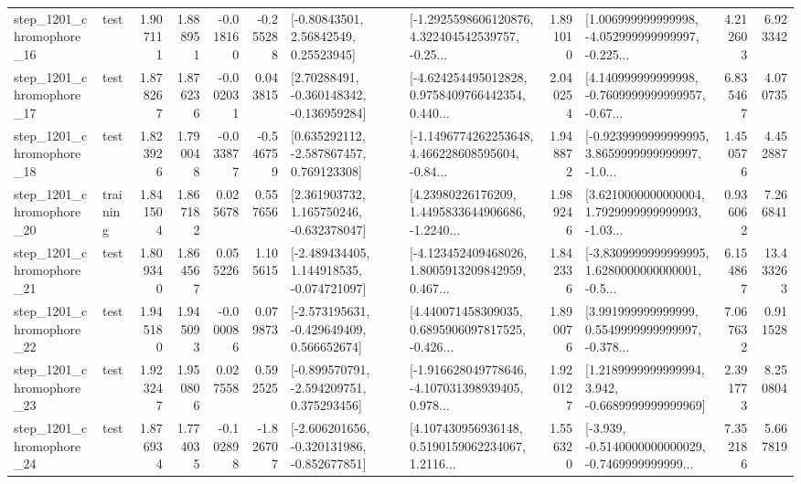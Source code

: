\begin{tabular}{llrrrrllrlrr}
 step\_1201\_chromophore\_16 &      test &      1.907111 &    1.888951 &     -0.018160 & -0.255288 &       [-0.80843501, 2.56842549, 0.25523945] &  [-1.2925598606120876, 4.322404542539757, -0.25... &       1.891010 &  [1.006999999999998, -4.052999999999997, -0.225... &            4.212603 &          6.923342 \\
 step\_1201\_chromophore\_17 &      test &      1.878267 &    1.876236 &     -0.002031 &  0.043815 &    [2.70288491, -0.360148342, -0.136959284] &  [-4.624254495012828, 0.9758409766442354, 0.440... &       2.040254 &  [4.140999999999998, -0.7609999999999957, -0.67... &            6.835467 &          4.070735 \\
 step\_1201\_chromophore\_18 &      test &      1.823926 &    1.790048 &     -0.033877 & -0.546759 &    [0.635292112, -2.587867457, 0.769123308] &  [-1.1496774262253648, 4.466228608595604, -0.84... &       1.948872 &  [-0.9239999999999995, 3.8659999999999997, -1.0... &            1.450576 &          4.452887 \\
 step\_1201\_chromophore\_20 &  training &      1.841504 &    1.867182 &      0.025678 &  0.557656 &    [2.361903732, 1.165750246, -0.632378047] &  [4.23980226176209, 1.4495833644906686, -1.2240... &       1.989246 &  [3.6210000000000004, 1.7929999999999993, -1.03... &            0.936062 &          7.266841 \\
 step\_1201\_chromophore\_21 &      test &      1.809340 &    1.864567 &      0.055226 &  1.105615 &   [-2.489434405, 1.144918535, -0.074721097] &  [-4.123452409468026, 1.8005913209842959, 0.467... &       1.842336 &  [-3.8309999999999995, 1.6280000000000001, -0.5... &            6.154867 &         13.433263 \\
 step\_1201\_chromophore\_22 &      test &      1.945180 &    1.945093 &     -0.000086 &  0.079873 &   [-2.573195631, -0.429649409, 0.566652674] &  [4.440071458309035, 0.6895906097817525, -0.426... &       1.890076 &  [3.991999999999999, 0.5549999999999997, -0.378... &            7.067632 &          0.911528 \\
 step\_1201\_chromophore\_23 &      test &      1.923247 &    1.950806 &      0.027558 &  0.592525 &   [-0.899570791, -2.594209751, 0.375293456] &  [-1.916628049778646, -4.107031398939405, 0.978... &       1.920127 &   [1.2189999999999994, 3.942, -0.6689999999999969] &            2.391773 &          8.250804 \\
 step\_1201\_chromophore\_24 &      test &      1.876934 &    1.774035 &     -0.102898 & -1.826707 &  [-2.606201656, -0.320131986, -0.852677851] &  [4.107430956936148, 0.5190159062234067, 1.2116... &       1.556320 &  [-3.939, -0.5140000000000029, -0.7469999999999... &            7.352186 &          5.667819 \\

\end{tabular}

